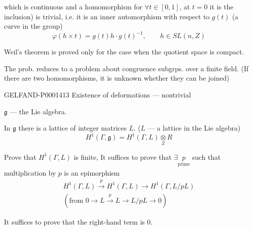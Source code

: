 which is continuous and a homomorphism for $\forall t\in[0,1]$, at $t=0$ it is the inclusion) is trivial, i.e. it is an inner automorphism with respect to $g (t)$ (a curve in the group)
\begin{equation*}\varphi (h\times t)=g (t)h\cdot g (t)^{-1},\qquad h\in SL (n, Z)\end{equation*}

Weil's theorem is proved only for the case when the quotient space is compact.

The prob. reduces to a problem about congruence subgrps. over a finite field.
(If there are two homomorphisms, it is unknown whether they can be joined)

\begin{GelfandAdjacentEvidence}{GELFAND-P000141}{3}
Existence of deformations — nontrivial
\begin{center}
\end{center}
\end{GelfandAdjacentEvidence}

$\mathfrak g$ — the Lie algebra.

In $\mathfrak g$ there is a lattice of integer matrices $L$. ($L$ — a lattice in the Lie algebra)
\begin{equation*}H^1(\Gamma,\mathfrak g)=H^1(\Gamma, L)\underset Z\otimes R\end{equation*}

Prove that $H^1(\Gamma, L)$ is finite,
It suffices to prove that $\exists\underset{\underline{\text{prime}}}{p}$ such that multiplication by $p$ is an epimorphism
\begin{gather*}
H^1(\Gamma, L)\overset p\longrightarrow H^1(\Gamma, L)\longrightarrow H^1(\Gamma, L/pL)\\
(\text{from }0\longrightarrow L\overset p\longrightarrow L\longrightarrow L/pL\longrightarrow0)
\end{gather*}

It suffices to prove that the right-hand term is $0$.

